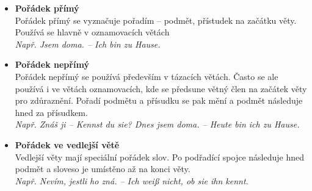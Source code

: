 \documentclass[12pt,a4paper]{report}
\begin{document}
\begin{itemize}
\item
\textbf{Pořádek přímý}\\
Pořádek přímý se vyznačuje pořadím -- podmět, přístudek na začátku věty. Používá se hlavně v oznamovacích větách\\
\textit{Např. Jsem doma. -- Ich bin zu Hause.}

\item
\textbf{Pořádek nepřímý}\\
Pořádek nepřímý se používá především v tázacích větách. Často se ale používá i ve větách oznamovacích, kde se předsune větný člen na začátek věty pro zdůraznění. Pořadí podmětu a přísudku se pak mění a podmět následuje hned za přísudkem.\\
\textit{Např. Znáš ji -- Kennst du sie? Dnes jsem doma. -- Heute bin ich zu Hause.}

\item
\textbf{Pořádek ve vedlejší větě}\\
Vedlejší věty mají speciální pořádek slov. Po podřadící spojce následuje hned podmět a sloveso je umístěno až na konci věty.\\
\textit{Např. Nevím, jestli ho zná. -- Ich weiß nicht, ob sie ihn kennt.}
\end{itemize}
\end{document}

